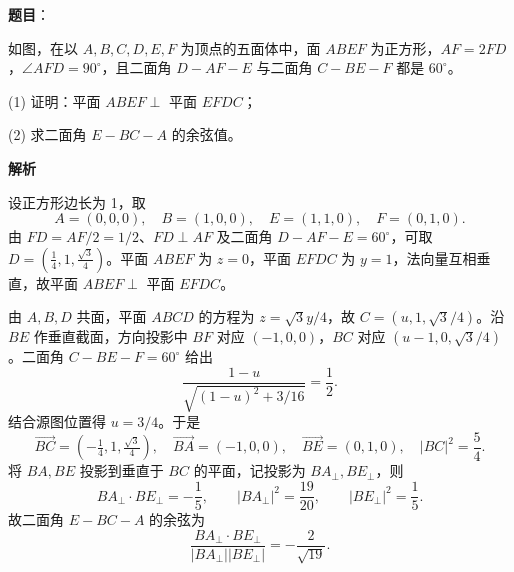 \begin{answer}

\textbf{题目}：

如图，在以 $A,B,C,D,E,F$ 为顶点的五面体中，面 $ABEF$ 为正方形，$AF=2FD$，$\angle AFD=90^\circ$，且二面角 $D-AF-E$ 与二面角 $C-BE-F$ 都是 $60^\circ$。
\nopagebreak[4]
\begin{center}\end{center}
\nopagebreak[4]
   (1) 证明：平面 $ABEF\perp$ 平面 $EFDC$；

   (2) 求二面角 $E-BC-A$ 的余弦值。

\textbf{解析}


设正方形边长为 1，取
\nopagebreak[4]
\[
A=(0,0,0),\quad B=(1,0,0),\quad E=(1,1,0),\quad F=(0,1,0).
\]
由 \(FD=AF/2=1/2\)、\(FD\perp AF\) 及二面角 \(D-AF-E=60^\circ\)，可取 \(D=(\frac14,1,\frac{\sqrt3}{4})\)。平面 \(ABEF\) 为 \(z=0\)，平面 \(EFDC\) 为 \(y=1\)，法向量互相垂直，故平面 \(ABEF\perp\) 平面 \(EFDC\)。


由 \(A,B,D\) 共面，平面 \(ABCD\) 的方程为 \(z=\sqrt3y/4\)，故 \(C=(u,1,\sqrt3/4)\)。沿 \(BE\) 作垂直截面，方向投影中 \(BF\) 对应 \((-1,0,0)\)，\(BC\) 对应 \((u-1,0,\sqrt3/4)\)。二面角 \(C-BE-F=60^\circ\) 给出
\nopagebreak[4]
\[
\frac{1-u}{\sqrt{(1-u)^2+3/16}}=\frac12.
\]
结合源图位置得 \(u=3/4\)。于是
\nopagebreak[4]
\[
\overrightarrow{BC}=(-\tfrac14,1,\tfrac{\sqrt3}{4}),\quad
\overrightarrow{BA}=(-1,0,0),\quad
\overrightarrow{BE}=(0,1,0),\quad |BC|^2=\frac54.
\]
将 \(BA,BE\) 投影到垂直于 \(BC\) 的平面，记投影为 \(BA_\perp,BE_\perp\)，则
\nopagebreak[4]
\[
BA_\perp\cdot BE_\perp=-\frac15,\qquad
|BA_\perp|^2=\frac{19}{20},\qquad |BE_\perp|^2=\frac15.
\]
故二面角 \(E-BC-A\) 的余弦为
\nopagebreak[4]
\[
\frac{BA_\perp\cdot BE_\perp}{|BA_\perp||BE_\perp|}
=-\frac{2}{\sqrt{19}}.
\]



\end{answer}
